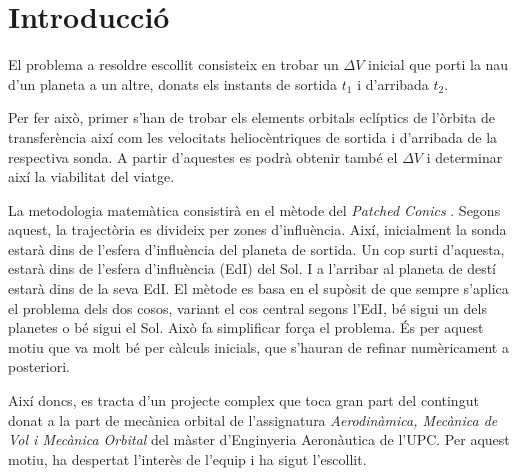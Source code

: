 \chapter{Introducció}

El problema a resoldre escollit consisteix en trobar un $\Delta V$ inicial que porti la nau d'un planeta a un altre, donats els instants de sortida $t_1$ i d'arribada $t_2$.

Per fer això, primer s'han de trobar els elements orbitals eclíptics de l'òrbita de transferència així com les velocitats heliocèntriques de sortida i d'arribada de la respectiva sonda. A partir d'aquestes es podrà obtenir també el $\Delta V$ i determinar així la viabilitat del viatge.

La metodologia matemàtica consistirà en el mètode del \textit{Patched Conics} \cite{Calaf2017d}. Segons aquest, la trajectòria es divideix per zones d'influència. Així, inicialment la sonda estarà dins de l'esfera d'influència del planeta de sortida. Un cop surti d'aquesta, estarà dins de l'esfera d'influència (EdI) del Sol. I a l'arribar al planeta de destí estarà dins de la seva EdI. El mètode es basa en el supòsit de que sempre s'aplica el problema dels dos cosos, variant el cos central segons l'EdI, bé sigui un dels planetes o bé sigui el Sol. Això fa simplificar força el problema. És per aquest motiu que va molt bé per càlculs inicials, que s'hauran de refinar numèricament a posteriori.

Així doncs, es tracta d'un projecte complex que toca gran part del contingut donat a la part de mecànica orbital de l'assignatura \textit{Aerodinàmica, Mecànica de Vol i Mecànica Orbital} del màster d'Enginyeria Aeronàutica de l'UPC. Per aquest motiu, ha despertat l'interès de l'equip i ha sigut l'escollit.



